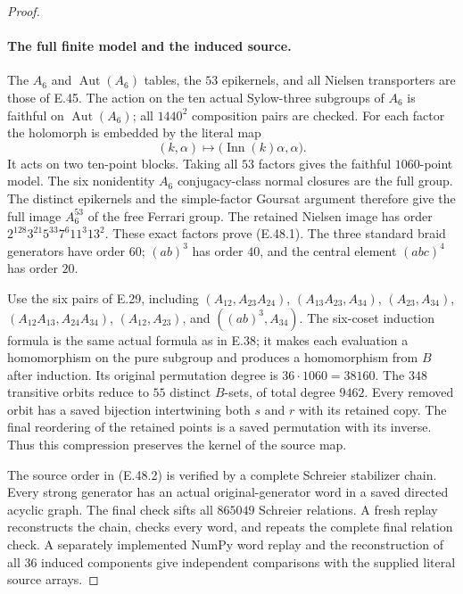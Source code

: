 \begin{proof}
\paragraph{The full finite model and the induced source.}
The $A_6$ and $\operatorname{Aut}(A_6)$ tables, the $53$ epikernels,
and all Nielsen transporters are those of E.45.
The action on the ten actual Sylow-three subgroups of $A_6$ is
faithful on $\operatorname{Aut}(A_6)$; all $1440^2$ composition
pairs are checked.
For each factor the holomorph is embedded by the literal map
\[
 (k,\alpha)\longmapsto
       \bigl(\operatorname{Inn}(k)\alpha,\alpha\bigr).
 \tag{E.48.6}
\]
It acts on two ten-point blocks.  Taking all $53$ factors gives
the faithful $1060$-point model.
The six nonidentity $A_6$ conjugacy-class normal closures are
the full group.  The distinct epikernels and the simple-factor
Goursat argument therefore give the full image $A_6^{53}$ of
the free Ferrari group.
The retained Nielsen image has order
$2^{128}3^{21}5^{33}7^6 11^3 13^2$.
These exact factors prove \textup{(E.48.1)}.
The three standard braid generators have order $60$;
$(ab)^3$ has order $40$, and the central element $(abc)^4$
has order $20$.

Use the six pairs of E.29, including
$(A_{12},A_{23}A_{24})$, $(A_{13}A_{23},A_{34})$,
$(A_{23},A_{34})$, $(A_{12}A_{13},A_{24}A_{34})$,
$(A_{12},A_{23})$, and $((ab)^3,A_{34})$.
The six-coset induction formula is the same actual formula as
in E.38; it makes each evaluation a homomorphism on the pure
subgroup and produces a homomorphism from $B$ after induction.
Its original permutation degree is $36\cdot1060=38160$.
The $348$ transitive orbits reduce to $55$ distinct $B$-sets,
of total degree $9462$.
Every removed orbit has a saved bijection intertwining both
$s$ and $r$ with its retained copy.
The final reordering of the retained points is a saved
permutation with its inverse.
Thus this compression preserves the kernel of the source map.

The source order in \textup{(E.48.2)} is verified by a complete
Schreier stabilizer chain.  Every strong generator has an actual
original-generator word in a saved directed acyclic graph.
The final check sifts all $865049$ Schreier relations.
A fresh replay reconstructs the chain, checks every word, and
repeats the complete final relation check.
A separately implemented NumPy word replay and the reconstruction
of all $36$ induced components give independent comparisons with
the supplied literal source arrays.


\end{proof}
